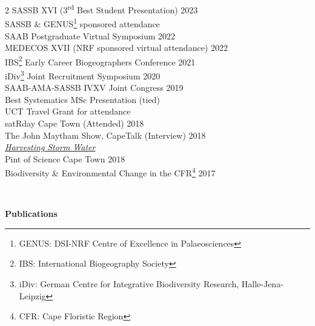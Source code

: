 \documentclass[10pt]{article}
\begin{document}
\begin{multicols}{2}
SASSB XVI {\small (3\textsuperscript{rd} Best Student Presentation)} \hfill {\small 2023} \\
  \hspace{2em} {\small SASSB \& GENUS\footnote{GENUS: DSI-NRF Centre of Excellence in Palaeosciences} sponsored attendance} \\
SAAB Postgraduate Virtual Symposium                      \hfill {\small 2022} \\
MEDECOS XVII {\small (NRF sponsored virtual attendance)} \hfill {\small 2022} \\
IBS\footnote{IBS: International Biogeography Society}
  Early Career Biogeographers Conference                 \hfill {\small 2021} \\
iDiv\footnote{iDiv: German Centre for Integrative
  Biodiversity Research, Halle-Jena-Leipzig} Joint
  Recruitment Symposium                                  \hfill {\small 2020} \\
SAAB-AMA-SASSB IVXV Joint Congress                       \hfill {\small 2019} \\
  \hspace{2em} {\small Best Systematics MSc Presentation
    (tied)}                                                                   \\
  \hspace{2em} {\small UCT Travel Grant for attendance}                     \\
satRday Cape Town {\small (Attended)}                    \hfill {\small 2018} \\
The John Maytham Show, CapeTalk {\small (Interview)}     \hfill {\small 2018} \\
  \hspace{2em} {\small \href{https://www.capetalk.co.za/articles/328900/harvesting-stormwater-from-liesbeek-river-may-aid-ct-water-supply-students-find}
    {\textit{Harvesting Storm Water}}}                                        \\
Pint of Science Cape Town                                \hfill {\small 2018} \\
Biodiversity \& Environmental Change in the CFR\footnote{
  CFR: Cape Floristic Region}                            \hfill {\small 2017}

\end{multicols} %

\

\vskip5pt

\textbf{\large Publications} %
\end{document}
